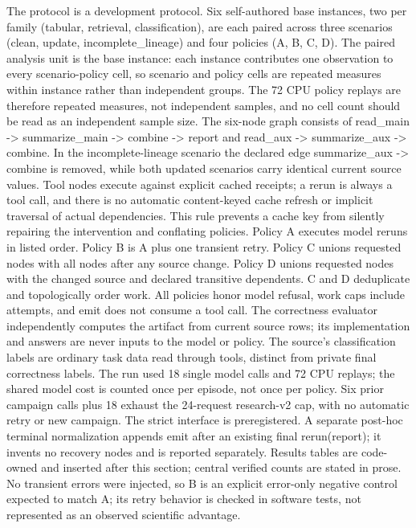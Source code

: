 \documentclass{article}
\begin{document}
The protocol is a development protocol. Six self-authored base instances, two per family (tabular, retrieval, classification), are each paired across three scenarios (clean, update, incomplete\_lineage) and four policies (A, B, C, D). The paired analysis unit is the base instance: each instance contributes one observation to every scenario-policy cell, so scenario and policy cells are repeated measures within instance rather than independent groups. The 72 CPU policy replays are therefore repeated measures, not independent samples, and no cell count should be read as an independent sample size. The six-node graph consists of read\_main -> summarize\_main -> combine -> report and read\_aux -> summarize\_aux -> combine. In the incomplete-lineage scenario the declared edge summarize\_aux -> combine is removed, while both updated scenarios carry identical current source values. Tool nodes execute against explicit cached receipts; a rerun is always a tool call, and there is no automatic content-keyed cache refresh or implicit traversal of actual dependencies. This rule prevents a cache key from silently repairing the intervention and conflating policies. Policy A executes model reruns in listed order. Policy B is A plus one transient retry. Policy C unions requested nodes with all nodes after any source change. Policy D unions requested nodes with the changed source and declared transitive dependents. C and D deduplicate and topologically order work. All policies honor model refusal, work caps include attempts, and emit does not consume a tool call. The correctness evaluator independently computes the artifact from current source rows; its implementation and answers are never inputs to the model or policy. The source's classification labels are ordinary task data read through tools, distinct from private final correctness labels. The run used 18 single model calls and 72 CPU replays; the shared model cost is counted once per episode, not once per policy. Six prior campaign calls plus 18 exhaust the 24-request research-v2 cap, with no automatic retry or new campaign. The strict interface is preregistered. A separate post-hoc terminal normalization appends emit after an existing final rerun(report); it invents no recovery nodes and is reported separately. Results tables are code-owned and inserted after this section; central verified counts are stated in prose. No transient errors were injected, so B is an explicit error-only negative control expected to match A; its retry behavior is checked in software tests, not represented as an observed scientific advantage.
\end{document}

